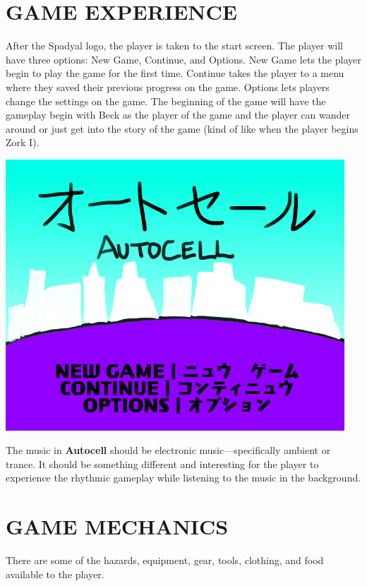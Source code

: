 \documentclass[12pt]{article}
\begin{document}
\begin{CJK}{UTF8}{min}
	\section*{GAME EXPERIENCE}
	After the Spadyal logo, the player is taken to the start screen. The player will have three options: New Game, Continue, and Options. New Game lets the player begin to play the game for the first time. Continue takes the player to a menu where they saved their previous progress on the game. Options lets players change the settings on the game. \newline \newline
	\noindent The beginning of the game will have the gameplay begin with Beck as the player of the game and the player can wander around or just get into the story of the game (kind of like when the player begins Zork I).
	\begin{center}
		\includegraphics[width=5in]{GameExperience}
	\end{center}
	The music in \textbf{Autocell} should be electronic music---specifically ambient or trance. It should be something different and interesting for the player to experience the rhythmic gameplay while listening to the music in the background.
	\newpage
	\section*{GAME MECHANICS}
	There are some of the hazards, equipment, gear, tools, clothing, and food available to the player.

\end{CJK}
\end{document}
